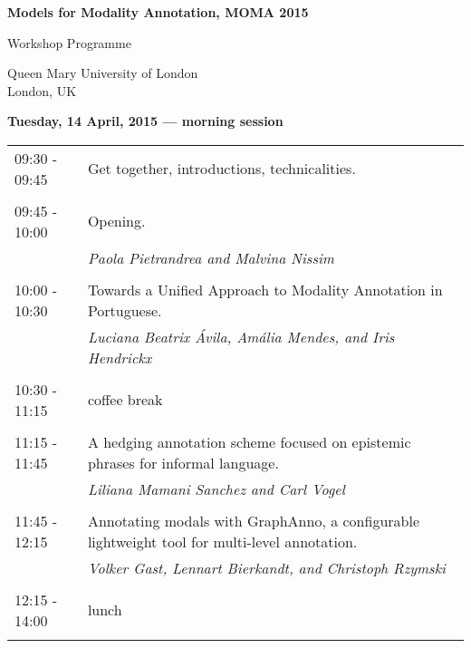 \documentclass[11pt]{article}
\begin{document}
\begin{center}
    {\bf
    \LARGE
    Models for Modality Annotation, MOMA 2015 
    
Workshop Programme
}

        Queen Mary University of London\\
    London, UK

\end{center}
%
%
%

\textbf{Tuesday, 14 April, 2015 --- morning session}

\begin{tabular} {ll}
09:30 - 09:45 & Get together, introductions, technicalities.       \\

& \\

09:45 - 10:00 & Opening.\\
 & \textit{Paola Pietrandrea and Malvina Nissim}\\

& \\

10:00 - 10:30 & Towards a Unified Approach to Modality Annotation in Portuguese. \\
 & \textit{Luciana Beatrix \'Avila, Am\'alia Mendes, and Iris Hendrickx} \\

& \\

10:30 - 11:15 & coffee break \\

& \\

11:15 - 11:45 &  A hedging annotation scheme focused on epistemic phrases for informal language.\\
& \textit{Liliana Mamani Sanchez and Carl Vogel}\\

& \\

11:45 - 12:15 & Annotating modals with GraphAnno, a configurable lightweight tool for multi-level annotation.\\
& \textit{Volker Gast, Lennart Bierkandt, and Christoph Rzymski}\\

& \\

12:15 - 14:00 &  lunch       \\

& \\

\end{tabular}
\end{document}
